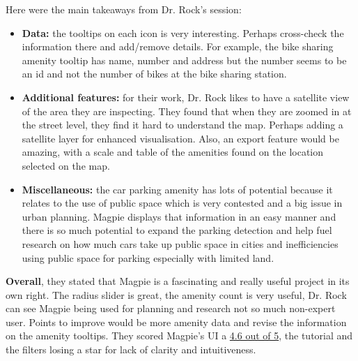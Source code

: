 \newpage Here were the main takeaways from Dr. Rock's session:
\begin{itemize}
    \item \textbf{Data:} the tooltips on each icon is very interesting. Perhaps
    cross-check the information there and add/remove details. For example, the
    bike sharing amenity tooltip has name, number and address but the number
    seems to be an id and not the number of bikes at the bike sharing station.
    \vspace{0.2cm}

    \item \textbf{Additional features:} for their work, Dr. Rock likes to have a
    satellite view of the area they are inspecting. They found that when they
    are zoomed in at the street level, they find it hard to understand the map.
    Perhaps adding a satellite layer for enhanced visualisation. Also, an
    export feature would be amazing, with a scale and table of the amenities
    found on the location selected on the map.
    \vspace{0.2cm}

    \item \textbf{Miscellaneous:} the car parking amenity has lots of potential
    because it relates to the use of public space which is very contested and a
    big issue in urban planning. Magpie displays that information in an easy
    manner and there is so much potential to expand the parking detection and
    help fuel research on how much cars take up public space in cities and
    inefficiencies using public space for parking especially with limited land.

\end{itemize}

\textbf{Overall}, they stated that Magpie is a fascinating and really useful
project in its own right. The radius slider is great, the amenity count is very
useful, Dr. Rock can see Magpie being used for planning and research not so much
non-expert user. Points to improve would be more amenity data and revise the
information on the amenity tooltips. They scored Magpie's UI a \underline{4.6
out of 5}, the tutorial and the filters losing a star for lack of clarity and
intuitiveness.

